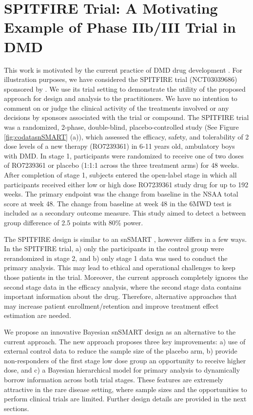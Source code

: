 \section{SPITFIRE Trial: A Motivating Example of Phase IIb/III Trial in DMD}
\label{s:motivating}
This work is motivated by the current practice of \ac{DMD} drug development \citep{hoffman2019vamorolone, clemens2020safety, lake2021bayesian}. For illustration purposes, we have considered the SPITFIRE trial (NCT03039686) sponsored by \citeauthor{roche}. We use its trial setting to demonstrate the utility of the proposed approach for design and analysis to the practitioners. We have no intention to comment on or judge the clinical activity of the treatments involved or any decisions by sponsors associated with the trial or compound. The SPITFIRE trial was a randomized, 2-phase, double-blind, placebo-controlled study (See Figure \ref{fig:codatasnSMART} (a)), which assessed the efficacy, safety, and tolerability of 2 dose levels of a new therapy (RO7239361) in 6-11 years old, ambulatory boys with \ac{DMD}. In stage 1, participants were randomized to receive one of two doses of RO7239361 or placebo (1:1:1 across the three treatment arms) for 48 weeks. After completion of stage 1, subjects entered the open-label stage in which all participants received either low or high dose RO7239361 study drug for up to 192 weeks. The primary endpoint was the change from baseline in the \ac{NSAA} total score at week 48. The change from baseline at week 48 in the \ac{6MWD} test is included as a secondary outcome measure. This study aimed to detect a between group difference of 2.5 points with 80\% power. 

The SPITFIRE design is similar to an \ac{snSMART} \citep{tamura2016small}, however differs in a few ways. In the SPITFIRE trial, a) only the participants in the control group were rerandomized in stage 2, and b) only stage 1 data was used to conduct the primary analysis. This may lead to ethical and operational challenges to keep those patients in the trial. Moreover, the current approach completely ignores the second stage data in the efficacy analysis, where the second stage data contains important information about the drug. Therefore, alternative approaches that may increase patient enrollment/retention and improve treatment effect estimation are needed.

We propose an innovative Bayesian \ac{snSMART} design as an alternative to the current approach. The new approach proposes three key improvements: a) use of external control data to reduce the sample size of the placebo arm, b) provide non-responders of the first stage low dose group an opportunity to receive higher dose, and c) a Bayesian hierarchical model for primary analysis to dynamically borrow information across both trial stages. These features are extremely attractive in the rare disease setting, where sample sizes and the opportunities to perform clinical trials are limited. Further design details are provided in the next sections.

